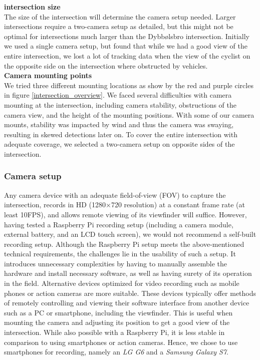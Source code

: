 \textbf{intersection size} \\
The size of the intersection will determine the camera setup needed. Larger intersections require a two-camera setup as detailed, 
but this might not be optimal for intersections much larger than the Dybbølsbro intersection. 
Initially we used a single camera setup, but found that while we had a good view of the entire intersection, 
we lost a lot of tracking data when the view of the cyclist on the opposite side on the intersection where obstructed by vehicles.
\ \\

\textbf{Camera mounting points} \\
We tried three different mounting locations as show by the red and purple circles in figure \ref{intersection_overview}. 
We faced several difficulties with camera mounting at the intersection, including camera stability, 
obstructions of the camera view, and the height of the mounting positions. 
With some of our camera mounts, stability was impacted by wind and thus the camera was swaying, resulting in skewed detections later on.
To cover the entire intersection with adequate coverage, we selected a two-camera setup on opposite sides of the intersection.

\subsubsection{Camera setup}
Any camera device with an adequate field-of-view (FOV) to capture the intersection, records in HD (1280×720 resolution) at a constant 
frame rate (at least 10FPS), and allows remote viewing of its viewfinder will suffice. 
However, having tested a Raspberry Pi recording setup (including a camera module, external battery, and an LCD touch screen), 
we would not recommend a self-built recording setup. Although the Raspberry Pi setup meets the above-mentioned technical requirements, 
the challenges lie in the usability of such a setup. 
It introduces unnecessary complexities by having to manually assemble the hardware and install necessary software, as well as 
having surety of its operation in the field.
Alternative devices optimized for video recording such as mobile phones or action cameras are more suitable.
These devices typically offer methods of remotely controlling and viewing their software interface from 
another device such as a PC or smartphone, including the viewfinder. 
This is useful when mounting the camera and adjusting its position to get a good view of the intersection. 
While also possible with a Raspberry Pi, it is less stable in comparison to using smartphones or action cameras.
Hence, we chose to use smartphones for recording, namely an \textit{LG G6} and a \textit{Samsung Galaxy S7}.

